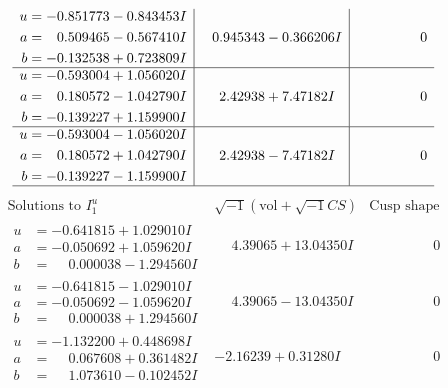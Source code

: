 \documentclass[1p]{elsarticle_modified}
\theoremstyle{definition}
\newcommand{\I}{\sqrt{-1}}
\begin{document}
$$\begin{array}{c|c|c}
\begin{aligned}
u &= -0.851773 - 0.843453 I \\
a &= \phantom{-}0.509465 - 0.567410 I \\
b &= -0.132538 + 0.723809 I\end{aligned}
 & \phantom{-}0.945343 - 0.366206 I & \phantom{-0.000000 } 0 \\ \hline\begin{aligned}
u &= -0.593004 + 1.056020 I \\
a &= \phantom{-}0.180572 - 1.042790 I \\
b &= -0.139227 + 1.159900 I\end{aligned}
 & \phantom{-}2.42938 + 7.47182 I & \phantom{-0.000000 } 0 \\ \hline\begin{aligned}
u &= -0.593004 - 1.056020 I \\
a &= \phantom{-}0.180572 + 1.042790 I \\
b &= -0.139227 - 1.159900 I\end{aligned}
 & \phantom{-}2.42938 - 7.47182 I & \phantom{-0.000000 } 0\\
 \hline 
 \end{array}$$\newpage$$\begin{array}{c|c|c}  
\text{Solutions to }I^u_{1}& \I (\text{vol} + \sqrt{-1}CS) & \text{Cusp shape}\\
 \hline 
\begin{aligned}
u &= -0.641815 + 1.029010 I \\
a &= -0.050692 + 1.059620 I \\
b &= \phantom{-}0.000038 - 1.294560 I\end{aligned}
 & \phantom{-}4.39065 + 13.04350 I & \phantom{-0.000000 } 0 \\ \hline\begin{aligned}
u &= -0.641815 - 1.029010 I \\
a &= -0.050692 - 1.059620 I \\
b &= \phantom{-}0.000038 + 1.294560 I\end{aligned}
 & \phantom{-}4.39065 - 13.04350 I & \phantom{-0.000000 } 0 \\ \hline\begin{aligned}
u &= -1.132200 + 0.448698 I \\
a &= \phantom{-}0.067608 + 0.361482 I \\
b &= \phantom{-}1.073610 - 0.102452 I\end{aligned}
 & -2.16239 + 0.31280 I & \phantom{-0.000000 } 0 \\ \hline\begin{aligned}

\end{aligned}
\end{array}$$
\end{document}
